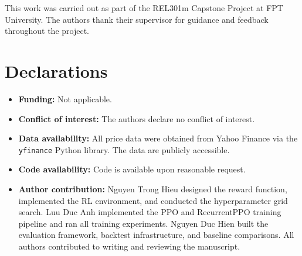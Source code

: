 \documentclass[pdflatex,sn-mathphys-num]{sn-jnl}
\begin{document}
This work was carried out as part of the REL301m Capstone Project at FPT
University. The authors thank their supervisor for guidance and feedback
throughout the project.

\section*{Declarations}

\begin{itemize}[leftmargin=*]
\item \textbf{Funding:} Not applicable.
\item \textbf{Conflict of interest:} The authors declare no conflict of interest.
\item \textbf{Data availability:} All price data were obtained from Yahoo Finance
      via the \texttt{yfinance} Python library. The data are publicly accessible.
\item \textbf{Code availability:} Code is available upon reasonable request.
\item \textbf{Author contribution:} Nguyen Trong Hieu designed the reward
      function, implemented the RL environment, and conducted the hyperparameter
      grid search. Luu Duc Anh implemented the PPO and RecurrentPPO training
      pipeline and ran all training experiments. Nguyen Duc Hien built the
      evaluation framework, backtest infrastructure, and baseline comparisons.
      All authors contributed to writing and reviewing the manuscript.
\end{itemize}


\end{document}
